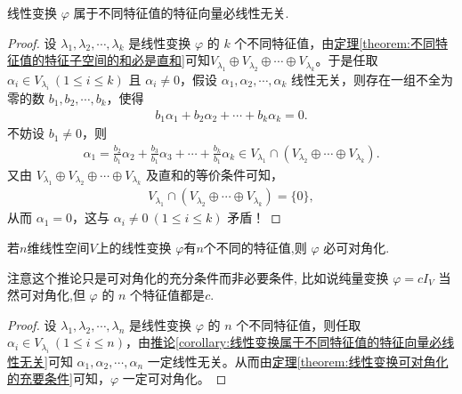 \documentclass[../../main.tex]{subfiles}
\begin{document}
\begin{corollary}\label{corollary:线性变换属于不同特征值的特征向量必线性无关}
线性变换 $\varphi$ 属于不同特征值的特征向量必线性无关.
\end{corollary}
\begin{proof}
设 $\lambda_1, \lambda_2, \cdots, \lambda_k$ 是线性变换 $\varphi$ 的 $k$ 个不同特征值，由\hyperref[theorem:不同特征值的特征子空间的和必是直和]{定理\ref{theorem:不同特征值的特征子空间的和必是直和}}可知$V_{\lambda_1} \oplus V_{\lambda_2} \oplus \cdots \oplus V_{\lambda_k}$。于是任取 $\alpha_i \in V_{\lambda_i} \ (1 \leqslant i \leqslant k)$ 且 $\alpha_i \ne 0$，假设 $\alpha_1, \alpha_2, \cdots, \alpha_k$ 线性无关，则存在一组不全为零的数 $b_1, b_2, \cdots, b_k$，使得
\begin{align*}
b_1 \alpha_1 + b_2 \alpha_2 + \cdots + b_k \alpha_k = 0.
\end{align*}
不妨设 $b_1 \ne 0$，则
\begin{align*}
\alpha_1 = \frac{b_2}{b_1} \alpha_2 + \frac{b_3}{b_1} \alpha_3 + \cdots + \frac{b_k}{b_1} \alpha_k \in V_{\lambda_1} \cap \left( V_{\lambda_2} \oplus \cdots \oplus V_{\lambda_k} \right).
\end{align*}
又由 $V_{\lambda_1} \oplus V_{\lambda_2} \oplus \cdots \oplus V_{\lambda_k}$ 及直和的等价条件可知，
\begin{align*}
V_{\lambda_1} \cap \left( V_{\lambda_2} \oplus \cdots \oplus V_{\lambda_k} \right) = \{ 0 \},
\end{align*}
从而 $\alpha_1 = 0$，这与 $\alpha_i \ne 0 \ (1 \leqslant i \leqslant k)$ 矛盾！
\end{proof}

\begin{corollary}
若$n$维线性空间$V$上的线性变换 $\varphi$有$n$个不同的特征值,则 $\varphi$ 必可对角化.
\end{corollary}
\begin{note}
注意这个推论只是可对角化的充分条件而非必要条件, 比如说纯量变换 $\varphi = cI_V$ 当然可对角化,但 $\varphi$ 的 $n$ 个特征值都是$c$.
\end{note}
\begin{proof}
设 $\lambda_1, \lambda_2, \cdots, \lambda_n$ 是线性变换 $\varphi$ 的 $n$ 个不同特征值，则任取 $\alpha_i \in V_{\lambda_i} \ (1 \leqslant i \leqslant n)$，由\hyperref[corollary:线性变换属于不同特征值的特征向量必线性无关]{推论\ref{corollary:线性变换属于不同特征值的特征向量必线性无关}}可知 $\alpha_1, \alpha_2, \cdots, \alpha_n$ 一定线性无关。从而由\hyperref[theorem:线性变换可对角化的充要条件]{定理\ref{theorem:线性变换可对角化的充要条件}}可知，$\varphi$ 一定可对角化。
\end{proof}
\end{document}
